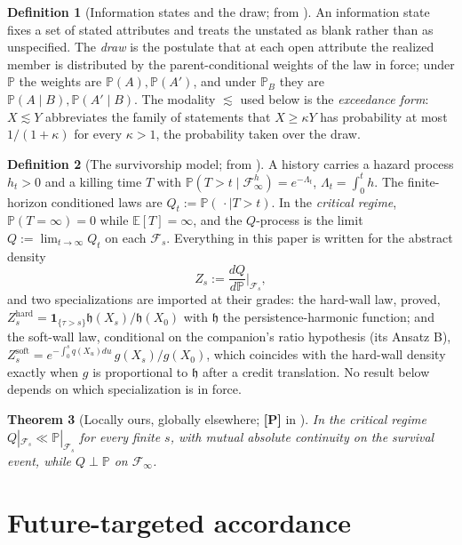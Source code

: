 \documentclass[11pt]{article}
\newcommand{\E}{\mathbb{E}}
\newcommand{\PP}{\mathbb{P}}
\newcommand{\one}{\mathbf{1}}
\newcommand{\Fc}{\mathcal{F}}
\newcommand{\hm}{\mathfrak{h}}
\theoremstyle{plain}
\newtheorem{theorem}{Theorem}[section]
\theoremstyle{definition}
\newtheorem{definition}[theorem]{Definition}
\theoremstyle{remark}
\begin{document}
\begin{definition}[Information states and the draw; from \cite{Nexus}]
\label{def:draw}
An information state fixes a set of stated attributes and treats the
unstated as blank rather than as unspecified. The \emph{draw} is the
postulate that at each open attribute the realized member is distributed
by the parent-conditional weights of the law in force; under $\PP$ the
weights are $\PP(A),\PP(A')$, and under $\PP_B$ they are
$\PP(A\mid B),\PP(A'\mid B)$. The modality $\lesssim$ used below is the
\emph{exceedance form}: $X\lesssim Y$ abbreviates the family of statements
that $X\ge\kappa Y$ has probability at most $1/(1+\kappa)$ for every
$\kappa>1$, the probability taken over the draw.
\end{definition}

\begin{definition}[The survivorship model; from \cite{SurvA}]
\label{def:model}
A history carries a hazard process $h_t>0$ and a killing time $T$ with
$\PP(T>t\mid\Fc^{h}_\infty)=e^{-\Lambda_t}$, $\Lambda_t=\int_0^th$. The
finite-horizon conditioned laws are $Q_t:=\PP(\,\cdot\mid T>t)$. In the
\emph{critical regime}, $\PP(T=\infty)=0$ while $\E[T]=\infty$, and the
$Q$-process is the limit $Q:=\lim_{t\to\infty}Q_t$ on each $\Fc_s$.
Everything in this paper is written for the abstract density
\[
Z_s:=\frac{dQ}{d\PP}\Big|_{\Fc_s},
\]
and two specializations are imported at their grades: the hard-wall
law, proved, $Z^{\mathrm{hard}}_s=\one_{\{\tau>s\}}\hm(X_s)/\hm(X_0)$ with
$\hm$ the persistence-harmonic function; and the soft-wall law,
conditional on the companion's ratio hypothesis (its Ansatz B),
$Z^{\mathrm{soft}}_s=e^{-\int_0^sq(X_u)du}\,g(X_s)/g(X_0)$, which
coincides with the hard-wall density exactly when $g$ is proportional to
$\hm$ after a credit translation. No result below depends on which
specialization is in force.
\end{definition}

\begin{theorem}[Locally ours, globally elsewhere; \textbf{[P]} in \cite{SurvA}]
\label{thm:singular}
In the critical regime $Q|_{\Fc_s}\ll\PP|_{\Fc_s}$ for every finite $s$,
with mutual absolute continuity on the survival event, while $Q\perp\PP$
on $\Fc_\infty$.
\end{theorem}

\section{Future-targeted accordance}\label{sec:theorem}
\end{document}

